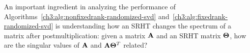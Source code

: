 
An important ingredient in analyzing the performance of
Algorithms~\ref{ch3:alg:nonfixedrank-randomized-svd}
and~\ref{ch3:alg:fixedrank-randomized-svd} is understanding how 
an SRHT changes the spectrum of a matrix after postmultiplication: given a 
matrix $\mathbf{A}$ and an SRHT matrix $\mathbf{\Theta}$, how are the singular values of 
$\mathbf{A}$ and $\mathbf{A}\mathbf{\Theta}^T$ related? 

